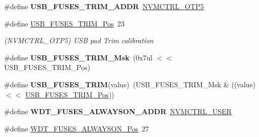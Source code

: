 \begin{DoxyCompactItemize}
\item 
\hypertarget{group__fuses__api_ga7c84bdced75dfd1ff6fcbdb7fe93071c}{}\#define {\bfseries U\+S\+B\+\_\+\+F\+U\+S\+E\+S\+\_\+\+T\+R\+I\+M\+\_\+\+A\+D\+D\+R}~\hyperlink{group___s_a_m_l21_j18_a__base_ga0bf5d3de41242cbb1e7b91ef11d6b794}{N\+V\+M\+C\+T\+R\+L\+\_\+\+O\+T\+P5}\label{group__fuses__api_ga7c84bdced75dfd1ff6fcbdb7fe93071c}

\item 
\hypertarget{group__fuses__api_ga699a137d838370a9163b858b8eecccaf}{}\#define \hyperlink{group__fuses__api_ga699a137d838370a9163b858b8eecccaf}{U\+S\+B\+\_\+\+F\+U\+S\+E\+S\+\_\+\+T\+R\+I\+M\+\_\+\+Pos}~23\label{group__fuses__api_ga699a137d838370a9163b858b8eecccaf}

\begin{DoxyCompactList}\small\item\em (N\+V\+M\+C\+T\+R\+L\+\_\+\+O\+T\+P5) U\+S\+B pad Trim calibration \end{DoxyCompactList}\item 
\hypertarget{group__fuses__api_ga8f7ad76b603288c4e9af162a61db34be}{}\#define {\bfseries U\+S\+B\+\_\+\+F\+U\+S\+E\+S\+\_\+\+T\+R\+I\+M\+\_\+\+Msk}~(0x7ul $<$$<$ U\+S\+B\+\_\+\+F\+U\+S\+E\+S\+\_\+\+T\+R\+I\+M\+\_\+\+Pos)\label{group__fuses__api_ga8f7ad76b603288c4e9af162a61db34be}

\item 
\hypertarget{group__fuses__api_ga8089214b3930d329e6dee1270f478fb5}{}\#define {\bfseries U\+S\+B\+\_\+\+F\+U\+S\+E\+S\+\_\+\+T\+R\+I\+M}(value)~(U\+S\+B\+\_\+\+F\+U\+S\+E\+S\+\_\+\+T\+R\+I\+M\+\_\+\+Msk \& ((value) $<$$<$ \hyperlink{group__fuses__api_ga699a137d838370a9163b858b8eecccaf}{U\+S\+B\+\_\+\+F\+U\+S\+E\+S\+\_\+\+T\+R\+I\+M\+\_\+\+Pos}))\label{group__fuses__api_ga8089214b3930d329e6dee1270f478fb5}

\item 
\hypertarget{group__fuses__api_ga3eb73a36a8769a4f7e0dfdac5e488351}{}\#define {\bfseries W\+D\+T\+\_\+\+F\+U\+S\+E\+S\+\_\+\+A\+L\+W\+A\+Y\+S\+O\+N\+\_\+\+A\+D\+D\+R}~\hyperlink{group___s_a_m_l21_j18_a__base_ga7a7a83a5753fa323b61536e396083c99}{N\+V\+M\+C\+T\+R\+L\+\_\+\+U\+S\+E\+R}\label{group__fuses__api_ga3eb73a36a8769a4f7e0dfdac5e488351}

\item 
\hypertarget{group__fuses__api_gaad4f4fec9a3339faea07db386174b75e}{}\#define \hyperlink{group__fuses__api_gaad4f4fec9a3339faea07db386174b75e}{W\+D\+T\+\_\+\+F\+U\+S\+E\+S\+\_\+\+A\+L\+W\+A\+Y\+S\+O\+N\+\_\+\+Pos}~27\label{group__fuses__api_gaad4f4fec9a3339faea07db386174b75e}


\end{DoxyCompactItemize}
